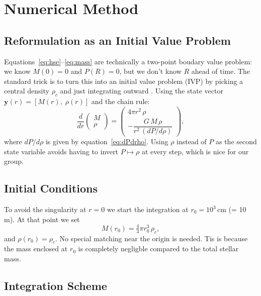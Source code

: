 \documentclass[12pt,letterpaper]{article}
\begin{document}
\section{Numerical Method}
\label{sec:numerics}

\subsection{Reformulation as an Initial Value Problem}

Equations~\eqref{eq:hse}--\eqref{eq:mass} are technically a two-point boudary value
problem: we know $M(0) = 0$ and $P(R) = 0$, but we don't know $R$ ahead of time.
The standard trick is to turn this into an initial value problem (IVP) by picking
a central density $\rho_c$ and just integrating outward \citep{prialnik2000}.
Using the state vector $\mathbf{y}(r) = [M(r),\;\rho(r)]$ and the chain rule:
\begin{equation}
  \frac{d}{dr}\begin{pmatrix}M\\\rho\end{pmatrix}
  =
  \begin{pmatrix}4\pi r^2\,\rho\\[4pt]
  -\dfrac{G\,M\,\rho}{r^2\,(dP/d\rho)}\end{pmatrix},
  \label{eq:ode_system}
\end{equation}
where $dP/d\rho$ is given by equation~\eqref{eq:dPdrho}.
Using $\rho$ instead of $P$ as the second state variable avoids having to invert
$P \mapsto \rho$ at every step, which is nice for our group.

\subsection{Initial Conditions}

To avoid the singularity at $r = 0$ we start the integration at $r_0 = 10^3$\,cm
(= 10\,m).
At that point we set
\begin{equation}
  M(r_0) = \tfrac{4}{3}\pi r_0^3\,\rho_c,
  \label{eq:ic}
\end{equation}
and $\rho(r_0) = \rho_c$.
No special matching near the origin is needed. 
Tis is because the mass enclosed at $r_0$ is completely negligble compared to the total stellar mass.

\subsection{Integration Scheme}
\end{document}
